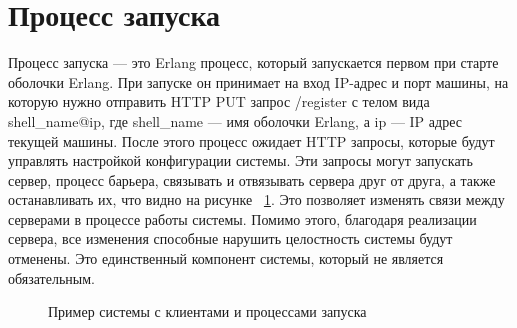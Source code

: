 	\section{Процесс запуска}
		Процесс запуска --- это Erlang процесс, который запускается первом при старте оболочки Erlang. При запуске он принимает на вход IP-адрес и порт 
		машины, на которую нужно отправить HTTP PUT запрос /register с телом вида shell\_name@ip, где shell\_name --- имя оболочки Erlang, а ip --- IP адрес
		текущей машины. После этого процесс ожидает HTTP запросы, которые будут управлять настройкой конфигурации системы. Эти запросы могут запускать
		сервер, процесс барьера, связывать и отвязывать сервера друг от друга, а также останавливать их, что видно на рисунке ~\ref{fig:st}. Это позволяет изменять связи между серверами 
		в процессе работы системы. Помимо этого, благодаря реализации сервера, все изменения способные нарушить целостность системы будут отменены.
		Это единственный компонент системы, который не является обязательным.
	
		\begin{figure}[H]
			\centering 
			\caption{Пример системы с клиентами и процессами запуска} 
			\label{fig:st}
		\end{figure}


